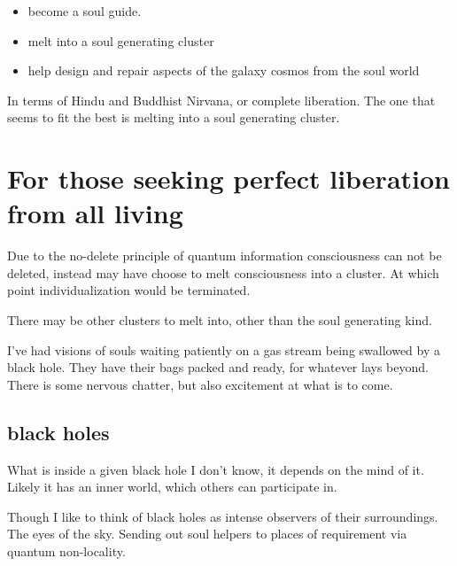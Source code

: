 \begin{itemize}
  \item become a soul guide\cite{newton1994journey}.
  \item melt into a soul generating cluster\cite{ascendedmasters}\cite{newton2000destiny}
  \item help design and repair aspects of the galaxy cosmos from the soul
world\cite{newton2000destiny}
\end{itemize}

In terms of Hindu and Buddhist Nirvana, or complete liberation.
The one that seems to fit the best is melting into a soul generating cluster. 

\section{For those seeking perfect liberation from all living}

Due to the no-delete principle of quantum
information\cite{quantumInformation}  consciousness can not
be deleted, instead may have choose to melt consciousness into a
cluster. At which point individualization would be terminated. 

There may be other clusters to melt into, other than the soul generating kind.

I've had visions of souls waiting patiently on a gas stream being swallowed by a
black hole. They have their bags packed and ready, for whatever lays beyond.
There is some nervous chatter, but also excitement at what is to come. 

\subsection{black holes}
What is inside a given black hole I don't know, it depends on the mind of it. 
Likely it has an inner world, which others can participate in.

Though I like to think of black holes as intense observers of their
surroundings.  The eyes of the sky. 
Sending out soul helpers to places of requirement via quantum non-locality.

